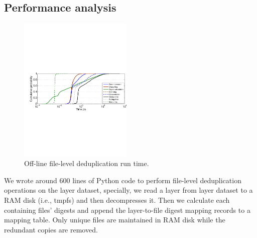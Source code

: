\subsection{Performance analysis}
%
\begin{figure}
	\centering
	\includegraphics[width=0.48\textwidth]{graphs/res-time.pdf}
	\caption{Off-line file-level deduplication run time.
	}
	\label{fig:dedup-res}
\end{figure}

%
%
%

We wrote around 600 lines of Python code to perform file-level deduplication
operations on the layer dataset, specially, we read a layer from layer dataset
to a RAM disk (i.e., tmpfs) and then decompresses it. 
%
Then we
calculate each containing files' digests and append the layer-to-file digest
mapping records to a mapping table. 
%
Only unique files are maintained in RAM
disk while the redundant copies are removed.

